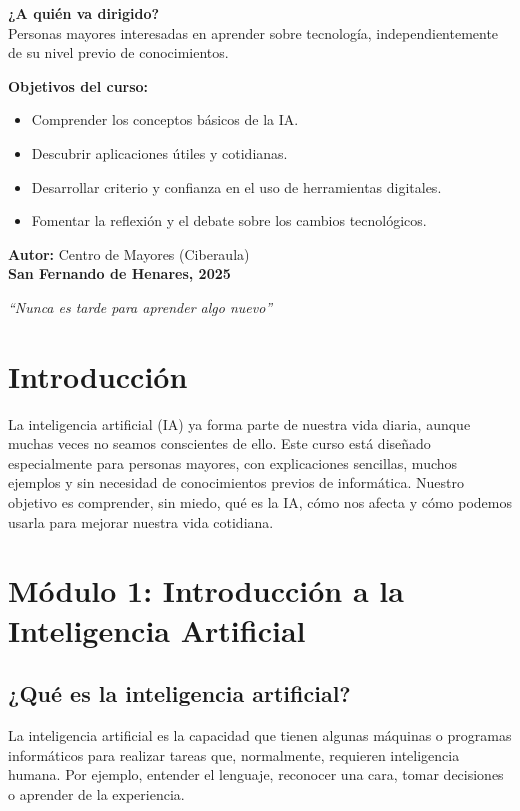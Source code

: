 \documentclass[12pt]{article}
\begin{document}
	\vspace{1cm}
	\textbf{¿A quién va dirigido?}\\
	Personas mayores interesadas en aprender sobre tecnología, independientemente de su nivel previo de conocimientos.
	
	\vspace{0.5cm}
	\textbf{Objetivos del curso:}
	\begin{itemize}
		\item Comprender los conceptos básicos de la IA.
		\item Descubrir aplicaciones útiles y cotidianas.
		\item Desarrollar criterio y confianza en el uso de herramientas digitales.
		\item Fomentar la reflexión y el debate sobre los cambios tecnológicos.
	\end{itemize}
	
	\vspace{0.5cm}
	\textbf{Autor:} Centro de Mayores (Ciberaula)\\
	\textbf{San Fernando de Henares, 2025}
	
	\vfill
	\begin{center}
		\textit{“Nunca es tarde para aprender algo nuevo”}
	\end{center}
	
	\newpage
	
	\tableofcontents
	\newpage
	
	\section*{Introducción}
	La inteligencia artificial (IA) ya forma parte de nuestra vida diaria, aunque muchas veces no seamos conscientes de ello. Este curso está diseñado especialmente para personas mayores, con explicaciones sencillas, muchos ejemplos y sin necesidad de conocimientos previos de informática. Nuestro objetivo es comprender, sin miedo, qué es la IA, cómo nos afecta y cómo podemos usarla para mejorar nuestra vida cotidiana.
	
	\section{\textbf{\normalsize Módulo 1: Introducción a la Inteligencia Artificial}}
	
	\subsection*{¿Qué es la inteligencia artificial?}
	La inteligencia artificial es la capacidad que tienen algunas máquinas o programas informáticos para realizar tareas que, normalmente, requieren inteligencia humana. Por ejemplo, entender el lenguaje, reconocer una cara, tomar decisiones o aprender de la experiencia.
	
\end{document}
